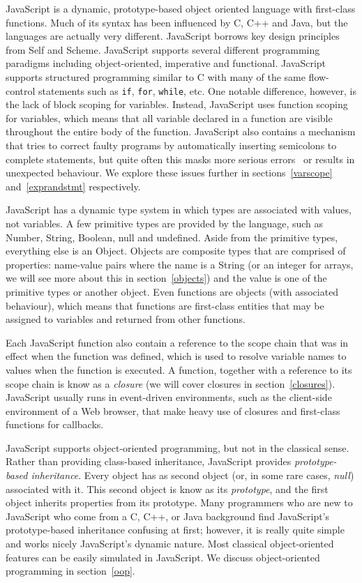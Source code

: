 JavaScript is a dynamic, prototype-based object oriented language with first-class
functions. Much of its syntax has been influenced by C, C++ and Java, but
the languages are actually very different. JavaScript borrows key design principles
from Self and Scheme. JavaScript supports several different programming
paradigms including object-oriented, imperative and functional. JavaScript supports
structured programming similar to C with many of the same flow-control statements
such as \texttt{if}, \texttt{for}, \texttt{while}, etc. One notable difference,
however, is the lack of block scoping for variables. Instead, JavaScript 
uses function scoping
for variables, which means that all variable declared in a function are
visible throughout the entire body of the function. 
JavaScript also contains a mechanism that tries to
correct faulty programs by automatically inserting semicolons to complete statements, but quite
often this masks more serious errors~\cite{goodparts} or results in unexpected behaviour.
We explore these issues further in sections~\ref{varscope} and~\ref{exprandstmt} respectively.

JavaScript has a dynamic type system in which types are associated with values,
not variables. A few primitive types are provided by the language, such
as Number, String, Boolean, null and undefined. Aside from the primitive types,
everything else is an Object. Objects are composite types
that are comprised of properties: name-value pairs where the name is a String
(or an integer for arrays, we will see more about this in section~\ref{objects})
and the value is one of the primitive types or another object. Even functions
are objects (with associated behaviour), which means that functions are first-class
entities that may be assigned to variables and returned from other functions.

Each JavaScript function also contain a reference to the scope chain that was
in effect when the function was defined, which is used to resolve variable
names to values when the function is executed. A function, together with a
reference to its scope chain is know as a \emph{closure} (we will cover closures
in section~\ref{closures}). 
JavaScript usually runs in event-driven environments, such as the client-side
environment of a Web browser, that make heavy use of closures and first-class 
functions for callbacks.

JavaScript supports object-oriented programming, but not in the classical
sense. Rather than providing class-based inheritance, JavaScript provides
\emph{prototype-based inheritance}. Every object has as second object (or,
in some rare cases, \emph{null}) associated with it. This second object is
know as its \emph{prototype}, and the first object inherits properties from
its prototype. Many programmers who are new to JavaScript who come from a
C, C++, or Java background find JavaScript's prototype-based inheritance
confusing at first; however, it is really quite simple and works nicely
JavaScript's dynamic nature. Most classical object-oriented features can be
easily simulated in JavaScript. We discuss object-oriented programming
in section~\ref{oop}.


